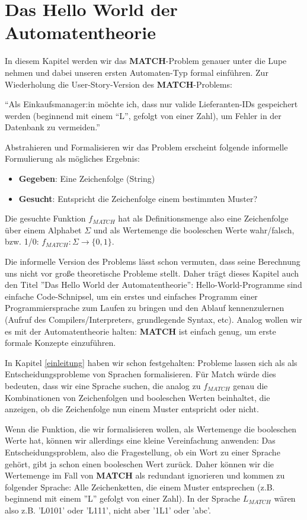 \chapter{Das Hello World der Automatentheorie}
In diesem Kapitel werden wir das \textbf{MATCH}-Problem genauer unter die Lupe nehmen
und dabei unseren ersten Automaten-Typ formal einführen.
Zur Wiederholung die User-Story-Version des \textbf{MATCH}-Problems:
\begin{center}
``Als Einkaufsmanager:in möchte ich, dass nur valide Lieferanten-IDs gespeichert werden
(beginnend mit einem ``L'', gefolgt von einer Zahl),
um Fehler in der Datenbank zu vermeiden.''
\end{center}
Abstrahieren und Formalisieren wir das Problem erscheint folgende informelle Formulierung
als mögliches Ergebnis:
\begin{itemize}
\item \textbf{Gegeben}: Eine Zeichenfolge (String)
\item \textbf{Gesucht}: Entspricht die Zeichenfolge einem bestimmten Muster?
\end{itemize}
Die gesuchte Funktion $f_{MATCH}$ hat als Definitionsmenge also eine Zeichenfolge
über einem Alphabet $\Sigma$ und als Wertemenge die booleschen Werte wahr/falsch,
bzw. 1/0: $f_{MATCH}: \Sigma \rightarrow \{0,1\}$.

Die informelle Version des Problems lässt schon vermuten,
dass seine Berechnung uns nicht vor große theoretische Probleme stellt.
Daher trägt dieses Kapitel auch den Titel ''Das Hello World der Automatentheorie'':
Hello-World-Programme sind einfache Code-Schnipsel,
um ein erstes und einfaches Programm einer Programmiersprache zum Laufen zu bringen
und den Ablauf kennenzulernen (Aufruf des Compilers/Interpreters, grundlegende Syntax, etc).
Analog wollen wir es mit der Automatentheorie halten:
\textbf{MATCH} ist einfach genug, um erste formale Konzepte einzuführen.



In Kapitel \autoref{einleitung} haben wir schon festgehalten:
Probleme lassen sich als als Entscheidungsprobleme von Sprachen formalisieren.
Für Match würde dies bedeuten, dass wir eine Sprache suchen,
die analog zu $f_{MATCH}$ genau die Kombinationen von Zeichenfolgen und booleschen Werten beinhaltet,
die anzeigen, ob die Zeichenfolge nun einem Muster entspricht oder nicht.

Wenn die Funktion, die wir formalisieren wollen, als Wertemenge die booleschen Werte hat,
können wir allerdings eine kleine Vereinfachung anwenden:
Das Entscheidungsproblem, also die Fragestellung, ob ein Wort zu einer Sprache gehört,
gibt ja schon einen booleschen Wert zurück.
Daher können wir die Wertemenge im Fall von \textbf{MATCH} als redundant ignorieren
und kommen zu folgender Sprache:
Alle Zeichenketten, die einem Muster entsprechen
(z.B. beginnend mit einem ''L'' gefolgt von einer Zahl).
In der Sprache $L_{MATCH}$ wären also z.B. 'L0101' oder 'L111',
nicht aber '1L1' oder 'abc'.

